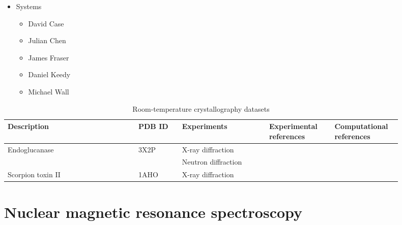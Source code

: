 \documentclass[9pt,review]{livecoms}
\begin{document}
\begin{itemize}
\begin{itemize}
	\item Systems

		\begin{itemize}
		\item David Case
		\item Julian Chen
		\item James Fraser
		\item Daniel Keedy
		\item Michael Wall
		\end{itemize}
	
	\end{itemize}

\end{itemize}

\begin{table*}[t]
\caption{Room-temperature crystallography datasets}
\begin{tabular}{p{0.3 \linewidth} p{0.1 \linewidth} p{0.2 \linewidth} p{0.15 \linewidth} p{0.15 \linewidth}}
\toprule
Description & PDB ID & Experiments & Experimental references & Computational references \\
\midrule
Endoglucanase & 3X2P & X-ray diffraction &  &  \\
& & Neutron diffraction & & \\
Scorpion toxin II & 1AHO & X-ray diffraction &  &  \\
\bottomrule
\end{tabular}
\label{tab:xtal}
\end{table*}

\section{Nuclear magnetic resonance spectroscopy}
\end{document}

